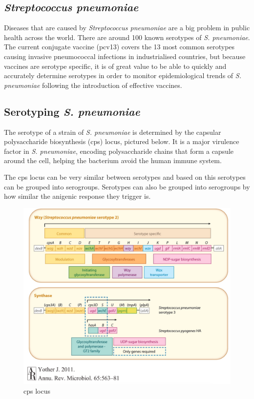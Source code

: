 \documentclass[11pt]{article}
\makeatletter
\def\maxwidth{\ifdim\Gin@nat@width>\linewidth\linewidth
    \else\Gin@nat@width\fi}
\let\Oldincludegraphics\includegraphics
\renewcommand{\includegraphics}[1]{\Oldincludegraphics[width=.8\maxwidth, height=.55\textheight, keepaspectratio]{#1}}
\makeatother
\begin{document}
    \hypertarget{streptococcus-pneumoniae}{%
\subsection{\texorpdfstring{\textit{Streptococcus
pneumoniae}}{Streptococcus pneumoniae}}\label{streptococcus-pneumoniae}}

    Diseases that are caused by \textit{Streptococcus pneumoniae} are a big
problem in public health across the world. There are around 100 known
serotypes of \textit{S. pneumoniae}. The current conjugate vaccine (pcv13)
covers the 13 most common serotypes causing invasive pneumococcal
infections in industrialised countries, but because vaccines are
serotype specific, it is of great value to be able to quickly and
accurately determine serotypes in order to monitor epidemiological
trends of \textit{S. pneumoniae} following the introduction of effective
vaccines.

    \hypertarget{serotyping-s.-pneumoniae}{%
\subsection{\texorpdfstring{Serotyping \textit{S.
pneumoniae}}{Serotyping S. pneumoniae}}\label{serotyping-s.-pneumoniae}}

    The serotype of a strain of \textit{S. pneumoniae} is determined by the
capsular polysaccharide biosynthesis (cps) locus, pictured below. It is
a major virulence factor in \textit{S. pneumoniae}, encoding
polysaccharide chains that form a capsule around the cell, helping the
bacterium avoid the human immune system.

The cps locus can be very similar between serotypes and based on this
serotypes can be grouped into serogroups. Serotypes can also be grouped
into serogroups by how similar the anigenic response they trigger is.

    \begin{figure}[H]
\centering
\includegraphics{img/cps_schema.png}
\caption{cps locus}
\end{figure}
\end{document}
